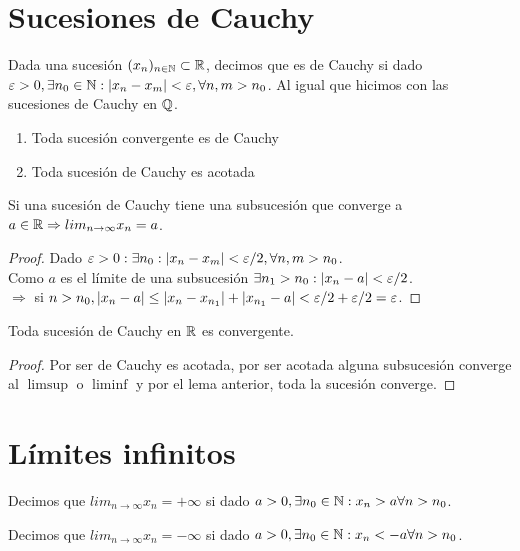 \section{Sucesiones de Cauchy}

Dada una sucesión $(x_n)_{n \in \mathbb{N}} \subset \mathbb{R}$, decimos que es de Cauchy si dado $\varepsilon > 0, \exists n_0 \in \mathbb{N} : |x_n - x_m| < \varepsilon, \forall n,m > n_0$. Al igual que hicimos con las sucesiones de Cauchy en $\mathbb{Q}$.

\begin{enumerate}
  \item Toda sucesión convergente es de Cauchy
  \item Toda sucesión de Cauchy es acotada
\end{enumerate}

\begin{lemma}
  Si una sucesión de Cauchy tiene una subsucesión que converge a $a \in \mathbb{R} \Rightarrow lim_{n \to \infty} x_n = a$.
  \begin{proof}
    Dado $\varepsilon > 0 : \exists n_0 : |x_n - x_m| < \varepsilon / 2, \forall n,m > n_0$. \\
    Como $a$ es el límite de una subsucesión $\exists n_1 > n_0 : |x_n - a| < \varepsilon / 2$. \\
    $\Rightarrow$ si $n > n_0, |x_n - a| \leq |x_n - x_{n_1}| + |x_{n_1} - a| < \varepsilon / 2 + \varepsilon / 2 = \varepsilon$.
  \end{proof}
\end{lemma}

\begin{theorem}
  Toda sucesión de Cauchy en $\mathbb{R}$ es convergente.
  \begin{proof}
    Por ser de Cauchy es acotada, por ser acotada alguna subsucesión converge al $\limsup$ o $\liminf$ y por el lema anterior, toda la sucesión converge.
  \end{proof}
\end{theorem}

\section{Límites infinitos}

\begin{definition}
  Decimos que $lim_{n \to \infty} x_n = + \infty$ si dado $a > 0, \exists n_0 \in \mathbb{N} : x_n > a \forall n > n_0$.
\end{definition}

\begin{definition}
  Decimos que $lim_{n \to \infty} x_n = - \infty$ si dado $a > 0, \exists n_0 \in \mathbb{N} : x_n < -a \forall n > n_0$.
\end{definition}


